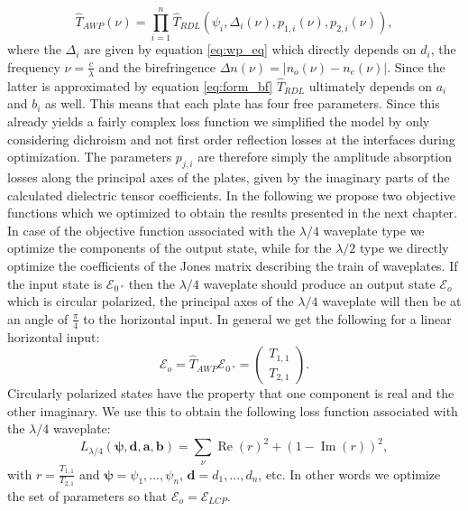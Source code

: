 \begin{equation}
    \hat{T}_{AWP}(\nu) = \prod_{i=1}^{n} \hat{T}_{RDL}(\psi_i, \Delta_i(\nu), p_{1,i}(\nu), p_{2,i}(\nu)),
\end{equation}
where the $\Delta_i$ are given by equation \ref{eq:wp_eq} which directly depends on $d_i$, the frequency $\nu=\frac{c}{\lambda}$ and the birefringence $\Delta n(\nu) = |n_o(\nu) - n_e(\nu)|$. Since the latter is approximated by equation \ref{eq:form_bf} $\hat{T}_{RDL}$ ultimately depends on $a_i$ and $b_i$ as well. This means that each plate has four free parameters. Since this already yields a fairly complex loss function we simplified the model by only considering dichroism and not first order reflection losses at the interfaces during optimization. The parameters $p_{j,i}$ are therefore simply the amplitude absorption losses along the principal axes of the plates, given by the imaginary parts of the calculated dielectric tensor coefficients. In the following we propose two objective functions which we optimized to obtain the results presented in the next chapter. In case of the objective function associated with the $\lambda/4$ waveplate type we optimize the components of the output state, while for the $\lambda/2$ type we directly optimize the coefficients of the Jones matrix describing the train of waveplates. If the input state is $\bm{\mathcal{E}}_{\SI{0}{\degree}}$ then the $\lambda/4$ waveplate should produce an output state $\bm{\mathcal{E}}_o$ which is circular polarized, the principal axes of the $\lambda/4$ waveplate will then be at an angle of $\frac{\pi}{4}$ to the horizontal input. In general we get the following for a linear horizontal input:
\begin{equation}
    \bm{\mathcal{E}}_o = \hat{T}_{AWP}\bm{\mathcal{E}}_{\SI{0}{\degree}} =
     \begin{pmatrix} T_{1,1} \\ T_{2,1} \end{pmatrix}.
\end{equation}
Circularly polarized states have the property that one component is real and the other imaginary. We use this to obtain the following loss function associated with the $\lambda/4$ waveplate:
\begin{equation}
\label{eq:l4_loss_function}
    L_{\lambda/4}(\bm{\psi}, \bm{d}, \bm{a}, \bm{b})=
    \sum_{\nu}\operatorname{Re}\left(r\right)^2+\left(1-\operatorname{Im}\left(r\right)\right)^2,
\end{equation}
with $r=\frac{T_{1,1}}{T_{2,1}}$ and $\bm{\psi}=\psi_1, ..., \psi_n$, $\bm{d}=d_1, ..., d_n$, etc. In other words we optimize the set of parameters so that $\bm{\mathcal{E}}_o=\bm{\mathcal{E}}_{LCP}$.
